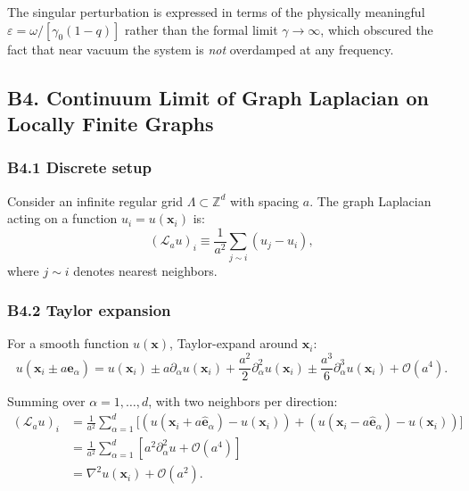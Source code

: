 \documentclass[reprint]{revtex4-2}
\begin{document}
The singular perturbation is expressed in terms of the physically meaningful $\varepsilon = \omega/[\gamma_0(1-q)]$ rather than the formal limit $\gamma\to\infty$, which obscured the fact that near vacuum the system is \emph{not} overdamped at any frequency.

\subsection{B4. Continuum Limit of Graph Laplacian on Locally Finite Graphs}

\subsubsection{B4.1 Discrete setup}

Consider an infinite regular grid $\Lambda \subset \mathbb{Z}^d$ with spacing $a$. The graph Laplacian acting on a function $u_i = u(\mathbf{x}_i)$ is:
\begin{equation}
(\mathcal{L}_a u)_i \equiv \frac{1}{a^2}\sum_{j \sim i} (u_j - u_i),
\end{equation}
where $j\sim i$ denotes nearest neighbors.

\subsubsection{B4.2 Taylor expansion}

For a smooth function $u(\mathbf{x})$, Taylor-expand around $\mathbf{x}_i$:
\begin{equation}
u(\mathbf{x}_i \pm a\hat{\mathbf{e}}_\alpha) = u(\mathbf{x}_i) \pm a\partial_\alpha u(\mathbf{x}_i) + \frac{a^2}{2}\partial_\alpha^2 u(\mathbf{x}_i) \pm \frac{a^3}{6}\partial_\alpha^3 u(\mathbf{x}_i) + \mathcal{O}(a^4).
\end{equation}

Summing over $\alpha = 1,\ldots,d$, with two neighbors per direction:
\begin{align}
(\mathcal{L}_a u)_i &= \frac{1}{a^2}\sum_{\alpha=1}^d \Big[(u(\mathbf{x}_i + a\hat{\mathbf{e}}_\alpha) - u(\mathbf{x}_i)) + (u(\mathbf{x}_i - a\hat{\mathbf{e}}_\alpha) - u(\mathbf{x}_i))\Big]\\
&= \frac{1}{a^2}\sum_{\alpha=1}^d \left[a^2\partial_\alpha^2 u + \mathcal{O}(a^4)\right]\\
&= \nabla^2 u(\mathbf{x}_i) + \mathcal{O}(a^2).
\label{eq:graph_laplacian_limit}
\end{align}
\end{document}
